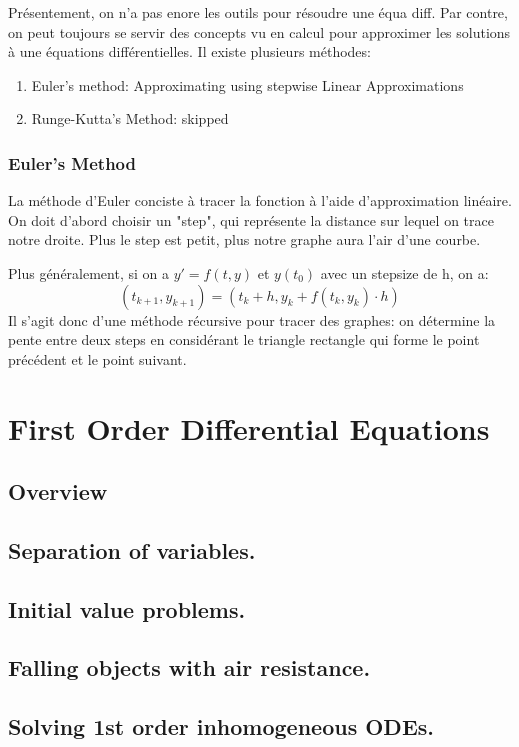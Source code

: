 \documentclass{article}
\begin{document}
Présentement, on n'a pas enore les outils pour résoudre une équa diff.
Par contre, on peut toujours se servir des concepts vu en calcul pour
approximer les solutions à une équations différentielles. Il existe
plusieurs méthodes:
\begin{enumerate}
    \item Euler's method: Approximating using stepwise Linear Approximations
    \item Runge-Kutta's Method: skipped
\end{enumerate}

\subsubsection{Euler's Method}

La méthode d'Euler conciste à tracer la fonction à l'aide d'approximation
linéaire. On doit d'abord choisir un "step", qui représente la distance
sur lequel on trace notre droite. Plus le step est petit, plus notre graphe
aura l'air d'une courbe.

Plus généralement, si on a $ y' = f(t,y)$ et $ y(t_0)$ avec un stepsize
de h, on a:
$$ (t_{k+1}, y_{k+1}) = (t_k + h, y_k + f(t_k, y_k) \cdot h) $$
Il s'agit donc d'une méthode récursive pour tracer des graphes:
on détermine la pente entre deux steps en considérant le triangle
rectangle qui forme le point précédent et le point suivant.

\pagebreak
\section{First Order Differential Equations}
\subsection*{Overview}

\subsection{Separation of variables. }
\subsection{Initial value problems.}
\subsection{Falling objects with air resistance.}
\subsection{Solving 1st order inhomogeneous ODEs.}
\end{document}
